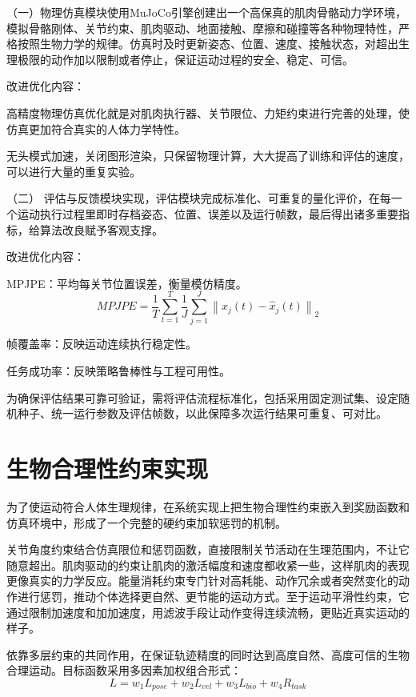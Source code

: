 （一）物理仿真模块使用MuJoCo引擎创建出一个高保真的肌肉骨骼动力学环境，模拟骨骼刚体、关节约束、肌肉驱动、地面接触、摩擦和碰撞等各种物理特性，严格按照生物力学的规律。仿真时及时更新姿态、位置、速度、接触状态，对超出生理极限的动作加以限制或者停止，保证运动过程的安全、稳定、可信。

改进优化内容：

高精度物理仿真优化就是对肌肉执行器、关节限位、力矩约束进行完善的处理，使仿真更加符合真实的人体力学特性。

无头模式加速，关闭图形渲染，只保留物理计算，大大提高了训练和评估的速度，可以进行大量的重复实验。

（二）
评估与反馈模块实现，评估模块完成标准化、可重复的量化评价，在每一个运动执行过程里即时存档姿态、位置、误差以及运行帧数，最后得出诸多重要指标，给算法改良赋予客观支撑。

改进优化内容：

MPJPE：平均每关节位置误差，衡量模仿精度。
\begin{equation}
MPJPE=\frac{1}{T}\sum_{t=1}^{T}\frac{1}{J}\sum_{j=1}^{J}\left\|x_j(t)-\widehat{x}_j(t)\right\|_2
\tag{4-1}
\end{equation}

帧覆盖率：反映运动连续执行稳定性。

任务成功率：反映策略鲁棒性与工程可用性。

为确保评估结果可靠可验证，需将评估流程标准化，包括采用固定测试集、设定随机种子、统一运行参数及评估帧数，以此保障多次运行结果可重复、可对比。

\section{生物合理性约束实现}\label{ux751fux7269ux5408ux7406ux6027ux7ea6ux675fux5b9eux73b0}

为了使运动符合人体生理规律，在系统实现上把生物合理性约束嵌入到奖励函数和仿真环境中，形成了一个完整的硬约束加软惩罚的机制。

关节角度约束结合仿真限位和惩罚函数，直接限制关节活动在生理范围内，不让它随意超出。肌肉驱动的约束让肌肉的激活幅度和速度都收紧一些，这样肌肉的表现更像真实的力学反应。能量消耗约束专门针对高耗能、动作冗余或者突然变化的动作进行惩罚，推动个体选择更自然、更节能的运动方式。至于运动平滑性约束，它通过限制加速度和加加速度，用滤波手段让动作变得连续流畅，更贴近真实运动的样子。

依靠多层约束的共同作用，在保证轨迹精度的同时达到高度自然、高度可信的生物合理运动。目标函数采用多因素加权组合形式：\\
\begin{equation}
L=w_1L_{pose}+w_2L_{vel}+w_3L_{bio}+w_4R_{task}
\tag{4-2}
\end{equation}

